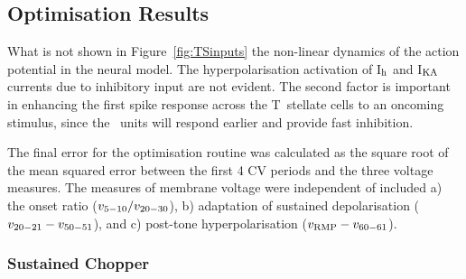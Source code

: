 

\subsection{Optimisation Results}



What is not shown in Figure~\ref{fig:TSinputs} the non-linear dynamics of the action potential in the neural model. The hyperpolarisation activation of I$_{\rm h}$ and I$_{\rm KA}$ currents due to inhibitory input are not evident.
The second factor is important in enhancing the first spike response across the T~stellate cells \citep{PaoliniClareyEtAl:2004} to an oncoming stimulus, since the \OnC~units will respond earlier and provide fast inhibition.


The final error for the optimisation routine was calculated as the square root of the mean squared error between the first 4 CV periods and the three voltage measures.
The measures of membrane voltage were independent of \RMP included a) the onset ratio ($v_{\rm 5-10}/v_{\rm 20-30}$), b) adaptation of sustained depolarisation ($v_{\rm 20-21} - v_{\rm 50-51}$), and c) post-tone hyperpolarisation ($v_{\rm RMP} - v_{\rm 60-61}$).

\subsubsection{Sustained Chopper}

